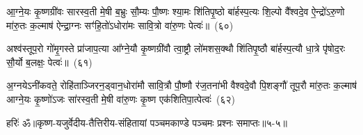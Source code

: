 {\anuvakamend[{अ॒ल॒जः सु॑प॒र्णो᳚\-ऽष्टाद॑शाष्टा॒द॑श}]}%

आ॒ग्ने॒यः कृ॒ष्णग्री॑वः सारस्व॒ती मे॒षी ब॒भ्रुः सौ॒म्यः पौ॒ष्णः श्या॒मः शि॑तिपृ॒ष्ठो बा॑र्\mbox{}हस्प॒त्यः शि॒ल्पो वै᳚श्वदे॒व ऐ॒न्द्रो॑\-ऽरु॒णो मा॑रु॒तः क॒ल्माष॑ ऐन्द्रा॒ग्नः सꣳ॑हि॒तो॑\-ऽधोरा॑मः सावि॒त्रो वा॑रु॒णः पेत्वः॑॥~(६०)\ip

{\anuvakamend[{आ॒ग्ने॒यो द्वाविꣳ॑शतिः}]}%

अश्व॑स्तूप॒रो गो॑मृ॒गस्ते प्रा॑जाप॒त्या आ᳚ग्ने॒यौ कृ॒ष्णग्री॑वौ त्वा॒ष्ट्रौ लो॑मशस॒क्थौ शि॑तिपृ॒ष्ठौ बा॑र्\mbox{}हस्प॒त्यौ धा॒त्रे पृ॑षोद॒रः सौ॒र्यो ब॒लक्षः॒ पेत्वः॑॥~(६१)\ip

{\anuvakamend[{अश्वः॒ षोड॑श}]}%

अ॒ग्नये\-ऽनी॑कवते॒ रोहि॑ताञ्जिरन॒ड्वान॒धोरा॑मौ सावि॒त्रौ पौ॒ष्णौ र॑ज॒तना॑भी वैश्वदे॒वौ पि॒शङ्गौ॑ तूप॒रौ मा॑रु॒तः क॒ल्माष॑ आग्ने॒यः कृ॒ष्णो॑\-ऽजः सा॑रस्व॒ती मे॒षी वा॑रु॒णः कृ॒ष्ण एक॑शितिपा॒त्पेत्वः॑~(६२)\ip

{\anuvakamend[{अ॒ग्नयो\-ऽनी॑कवते॒ द्वाविꣳ॑शतिः}]}%

{हरिः॑ ॐ}{॥कृष्ण-यजुर्वेदीय-तैत्तिरीय-संहितायां पञ्चमकाण्डे पञ्चमः प्रश्नः समाप्तः॥५-५॥}


